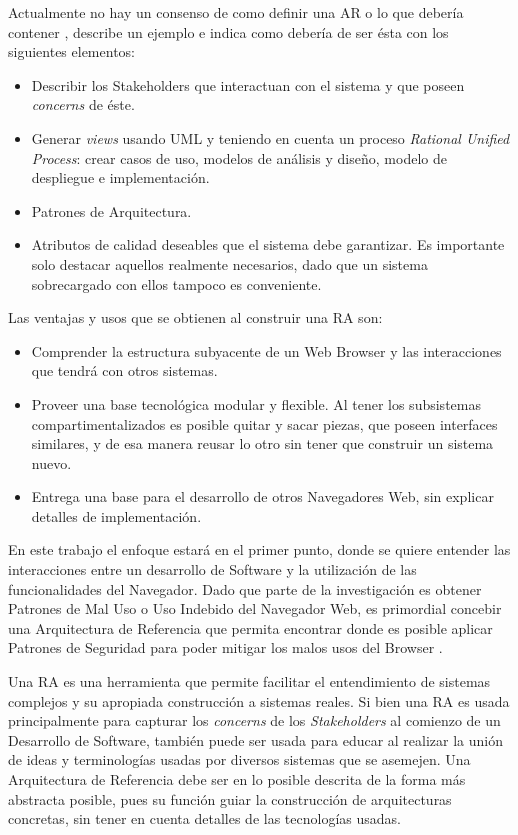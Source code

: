 Actualmente no hay un consenso de como definir una AR o lo que debería contener \cite{Angelov2012}, \cite{Avgeriou2003} describe un ejemplo e indica como debería de ser ésta con los siguientes elementos:
\begin{itemize}
    \item Describir los Stakeholders que interactuan con el sistema y que poseen \textit{concerns} de éste.
    \item Generar \textit{views} usando UML y teniendo en cuenta un proceso \textit{Rational Unified Process}: crear casos de uso, modelos de análisis y diseño, modelo de despliegue e implementación.
    \item Patrones de Arquitectura.
    \item Atributos de calidad deseables que el sistema debe garantizar. Es importante solo destacar aquellos realmente necesarios, dado que un sistema sobrecargado con ellos tampoco es conveniente.
\end{itemize}

Las ventajas y usos que se obtienen al construir una RA son:
\begin{itemize}
    \item Comprender la estructura subyacente de un Web Browser y las interacciones que tendrá con otros sistemas.
    \item Proveer una base tecnológica modular y flexible. Al tener los subsistemas compartimentalizados es posible quitar y sacar piezas, que poseen interfaces similares, y de esa manera reusar lo otro sin tener que construir un sistema nuevo.
    \item Entrega una base para el desarrollo de otros Navegadores Web, sin explicar detalles de implementación.
\end{itemize}

En este trabajo el enfoque estará en el primer punto, donde se quiere entender las interacciones entre un desarrollo de Software y la utilización de las funcionalidades del Navegador. Dado que parte de la investigación es obtener Patrones de Mal Uso o Uso Indebido del Navegador Web, es primordial concebir una Arquitectura de Referencia que permita encontrar donde es posible aplicar Patrones de Seguridad para poder mitigar los malos usos del Browser \cite{Submitted2014}. 

Una RA es una herramienta que permite facilitar el entendimiento de sistemas complejos y su apropiada construcción a sistemas reales. Si bien una RA es usada principalmente para capturar los \textit{concerns} de los \textit{Stakeholders} al comienzo de un Desarrollo de Software, también puede ser usada para educar al realizar la unión de ideas y terminologías usadas por diversos sistemas que se asemejen. Una Arquitectura de Referencia debe ser en lo posible descrita de la forma más abstracta posible, pues su función guiar la construcción de arquitecturas concretas, sin tener en cuenta detalles de las tecnologías usadas. 

